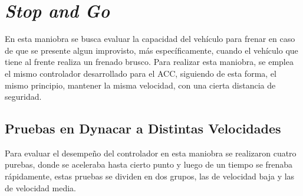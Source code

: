 \section{\textit{Stop and Go}}
En esta maniobra se busca evaluar la capacidad del vehículo para frenar en caso de que se presente algun improvisto, más específicamente, cuando el vehículo que tiene al frente realiza un frenado brusco. Para realizar esta maniobra, se emplea el mismo controlador desarrollado para el ACC, siguiendo de esta forma, el mismo principio, mantener la misma velocidad, con una cierta distancia de seguridad.

\subsection{Pruebas en Dynacar a Distintas Velocidades}
Para evaluar el desempeño del controlador en esta maniobra se realizaron cuatro purebas, donde se aceleraba hasta cierto punto y luego de un tiempo se frenaba rápidamente, estas pruebas se dividen en dos grupos, las de velocidad baja y las de velocidad media.  
 
